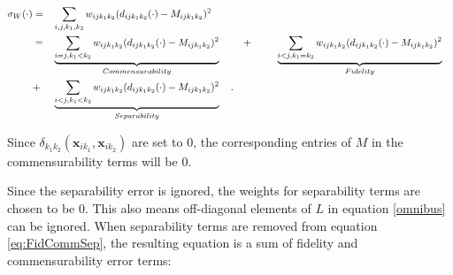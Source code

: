 \documentclass[12pt,oneside,final]{thesis}\usepackage[]{graphicx}\usepackage[]{color}
\begin{document}
\begin{align}
\sigma_W(\cdot)  &= & &\sum_{i,j,k_1,k_2} {w_{ij{k_1}{k_2}}(d_{ij{k_1}{k_2}}(\cdot)-M_{ijk_1k_2})^2 } \notag\\
\hspace{3pt} &=& &\underbrace{\sum_{i=j,k_1<k_2}  {w_{ij{k_1}{k_2}}(d_{ij{k_1}{k_2}}(\cdot)-M_{ijk_1k_2})^2}}_{Commensurability}  \hspace{10pt}  &  + &\hspace{2.5em} \underbrace{\sum_{i<j,k_1=k_2}  {w_{ij{k_1}{k_2}}(d_{ij{k_1}{k_2}}(\cdot)-M_{ijk_1k_2})^2  }  } _{Fidelity}\notag\\
\hspace{3pt}&+&  &\underbrace{\sum_{i< j,k_1<k_2}  {w_{ij{k_1}{k_2}}(d_{ij{k_1}{k_2}}(\cdot)-M_{ijk_1k_2})^2  }  } _{Separability}\label{eq:FidCommSep}\hspace{10pt} .
\end{align}

Since ${ \delta_{k_1k_2}}(\bm{x}_{ik_1},\bm{x}_{ik_2}) $ are set to 0, the corresponding entries of $M$ in the commensurability terms will be 0.

Since    the separability error is ignored,  the weights for separability terms are chosen to be 0. This also means off-diagonal elements of $L$ in equation \eqref{omnibus} can be ignored. When separability terms are removed from equation \eqref{eq:FidCommSep}, the resulting equation  is a sum of fidelity and commensurability error terms:
\end{document}
